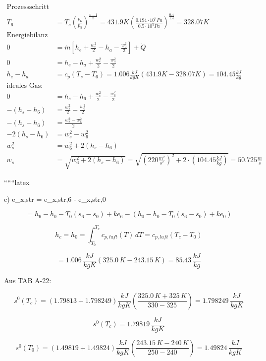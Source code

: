 \begin{align*}
    \text{Prozessschritt 5-6 isentrop:} \\
    T_6 &= T_s \left( \frac{p_6}{p_5} \right)^{\frac{n-1}{n}} = 431.9K \left( \frac{0.194 \cdot 10^5 Pa}{0.5 \cdot 10^5 Pa} \right)^{\frac{0.4}{1.4}} = 328.07K \\
    \text{Energiebilanz an Schubdüse:} \\
    0 &= \dot{m} \left[ h_e + \frac{w_e^2}{2} - h_a - \frac{w_a^2}{2} \right] + \dot{Q} \\
    0 &= h_e - h_a + \frac{w_e^2}{2} - \frac{w_a^2}{2} \\
    h_e - h_a &= c_p \left( T_s - T_6 \right) = 1.006 \frac{kJ}{kgK} \left( 431.9K - 328.07K \right) = 104.45 \frac{kJ}{kg} \\
    \text{ideales Gas:} \\
    0 &= h_s - h_6 + \frac{w_s^2}{2} - \frac{w_6^2}{2} \\
    -(h_s - h_6) &= \frac{w_s^2}{2} - \frac{w_6^2}{2} \\
    -(h_s - h_6) &= \frac{w_s^2 - w_6^2}{2} \\
    -2(h_s - h_6) &= w_s^2 - w_6^2 \\
    w_s^2 &= w_6^2 + 2(h_s - h_6) \\
    w_s &= \sqrt{w_6^2 + 2(h_s - h_6)} = \sqrt{(220 \frac{m^2}{s^2})^2 + 2 \cdot (104.45 \frac{kJ}{kg})} = 50.725 \frac{m}{s}
\end{align*}

``````latex


c) \quad \Delta e_{x,str} = e_{x,str,6} - e_{x,str,0}

\[
= h_6 - h_0 - T_0 (s_6 - s_0) + ke_6 - \left( h_0 - h_0 - T_0 \left( s_6 - s_0 \right) + ke_0 \right)
\]

\[
h_c = h_0 = \int_{T_0}^{T_c} c_{p,luft} (T) \, dT = c_{p,luft} (T_c - T_0)
\]

\[
= 1.006 \, \frac{kJ}{kgK} \left( 325.0 \, K - 243.15 \, K \right) = 85.43 \, \frac{kJ}{kg}
\]

Aus TAB A-22:

\[
s^0 (T_c) = \left( 1.79813 + 1.798249 \right) \frac{kJ}{kgK} \left( \frac{325.0 \, K + 325 \, K}{330 - 325} \right) = 1.798249 \, \frac{kJ}{kgK}
\]

\[
s^0 (T_c) = 1.79819 \, \frac{kJ}{kgK}
\]

\[
s^0 (T_0) = \left( 1.49819 + 1.49824 \right) \frac{kJ}{kgK} \left( \frac{243.15 \, K - 240 \, K}{250 - 240} \right) = 1.49824 \, \frac{kJ}{kgK}
\]

